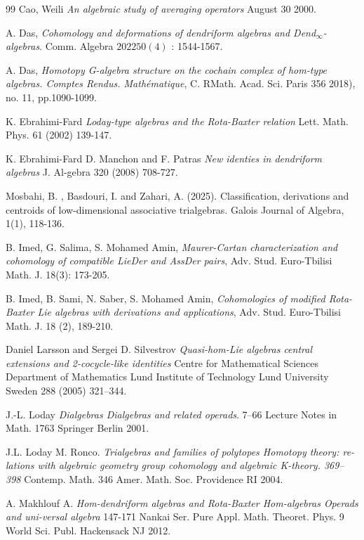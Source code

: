 \documentclass[11pt,twoside,reqno]{amsart}
\theoremstyle{plain}
\theoremstyle{definition}
\begin{document}
\begin{thebibliography}{99}
  Cao, Weili {\it An algebraic study of averaging operators} August 30  2000.

 A. Das, {\it Cohomology and deformations of dendriform algebras  and Dend$_\infty$-algebras}. Comm. Algebra  $2022  50(4)$ : 1544-1567.

A. Das, {\it Homotopy G-algebra structure on the cochain complex of hom-type algebras. Comptes Rendus. Mathématique}, C. RMath. Acad. Sci. Paris 356 2018), no. 11, pp.1090-1099.


  K. Ebrahimi-Fard  {\it Loday-type algebras and the Rota-Baxter relation}  Lett. Math. Phys. 61 (2002)  139-147.


 K. Ebrahimi-Fard  D. Manchon and F. Patras  {\it New identies in dendriform algebras}  J. Al-gebra 320 (2008)  708-727.
	
	
Mosbahi, B. , Basdouri, I. and Zahari, A. (2025). Classification, derivations and centroids of low-dimensional associative trialgebras. Galois Journal of Algebra, 1(1), 118-136.


B. Imed, G. Salima, S. Mohamed Amin, \textit{Maurer-Cartan characterization and cohomology of compatible LieDer and AssDer pairs}, Adv. Stud. Euro-Tbilisi Math. J. 18(3): 173-205. 

B. Imed, B. Sami, N. Saber, S. Mohamed Amin, \textit{Cohomologies of modified Rota-Baxter Lie algebras with derivations and applications}, Adv. Stud. Euro-Tbilisi Math. J. 18 (2), 189-210.


 Daniel Larsson and  Sergei D. Silvestrov {\it Quasi-hom-Lie algebras  central extensions and 2-cocycle-like identities}  Centre for Mathematical Sciences  Department of Mathematics  Lund Institute of Technology  Lund University  Sweden 288 (2005) 321–344.


 J.-L. Loday {\it Dialgebras  Dialgebras and related operads}. 7–66  Lecture Notes in Math.  1763  Springer  Berlin  2001.


 J.L. Loday  M. Ronco. {\it Trialgebras and families of polytopes  Homotopy theory: re-
lations with algebraic geometry  group cohomology  and algebraic K-theory. 369–398}  Contemp. Math.  346  Amer. Math. Soc.  Providence  RI  2004.


 A. Makhlouf A. {\it Hom-dendriform algebras and Rota-Baxter Hom-algebras  Operads and uni-versal algebra}  147-171  Nankai Ser. Pure Appl. Math. Theoret. Phys.  9  World Sci. Publ. 
Hackensack  NJ  2012.



\end{thebibliography}
\end{document}
